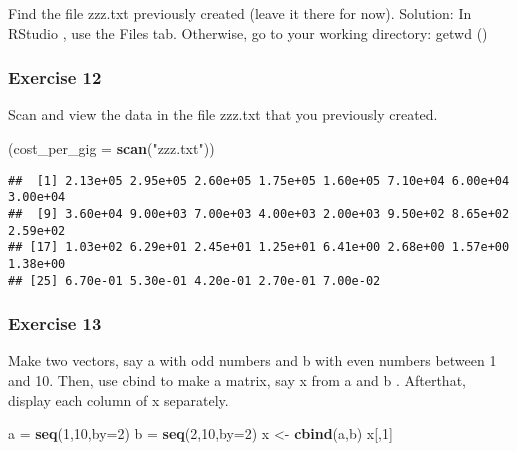 \documentclass[
]{article}
\newenvironment{Shaded}{\begin{snugshade}}{\end{snugshade}}
\newcommand{\DataTypeTok}[1]{\textcolor[rgb]{0.13,0.29,0.53}{#1}}
\newcommand{\DecValTok}[1]{\textcolor[rgb]{0.00,0.00,0.81}{#1}}
\newcommand{\KeywordTok}[1]{\textcolor[rgb]{0.13,0.29,0.53}{\textbf{#1}}}
\newcommand{\NormalTok}[1]{#1}
\newcommand{\StringTok}[1]{\textcolor[rgb]{0.31,0.60,0.02}{#1}}
\begin{document}
Find the file zzz.txt previously created (leave it there for now).
Solution: In RStudio , use the Files tab. Otherwise, go to your working
directory: getwd ()

\hypertarget{exercise-12}{%
\subsubsection{Exercise 12}\label{exercise-12}}

Scan and view the data in the file zzz.txt that you previously created.

\begin{Shaded}
\begin{Highlighting}[]
\NormalTok{(}\DataTypeTok{cost\_per\_gig =} \KeywordTok{scan}\NormalTok{(}\StringTok{"zzz.txt"}\NormalTok{))}
\end{Highlighting}
\end{Shaded}

\begin{verbatim}
##  [1] 2.13e+05 2.95e+05 2.60e+05 1.75e+05 1.60e+05 7.10e+04 6.00e+04 3.00e+04
##  [9] 3.60e+04 9.00e+03 7.00e+03 4.00e+03 2.00e+03 9.50e+02 8.65e+02 2.59e+02
## [17] 1.03e+02 6.29e+01 2.45e+01 1.25e+01 6.41e+00 2.68e+00 1.57e+00 1.38e+00
## [25] 6.70e-01 5.30e-01 4.20e-01 2.70e-01 7.00e-02
\end{verbatim}

\hypertarget{exercise-13}{%
\subsubsection{Exercise 13}\label{exercise-13}}

Make two vectors, say a with odd numbers and b with even numbers between
1 and 10. Then, use cbind to make a matrix, say x from a and b .
Afterthat, display each column of x separately.

\begin{Shaded}
\begin{Highlighting}[]
\NormalTok{a =}\StringTok{ }\KeywordTok{seq}\NormalTok{(}\DecValTok{1}\NormalTok{,}\DecValTok{10}\NormalTok{,}\DataTypeTok{by=}\DecValTok{2}\NormalTok{)}
\NormalTok{b =}\StringTok{ }\KeywordTok{seq}\NormalTok{(}\DecValTok{2}\NormalTok{,}\DecValTok{10}\NormalTok{,}\DataTypeTok{by=}\DecValTok{2}\NormalTok{)}
\NormalTok{x \textless{}{-}}\StringTok{ }\KeywordTok{cbind}\NormalTok{(a,b)}
\NormalTok{x[,}\DecValTok{1}\NormalTok{]}
\end{Highlighting}
\end{Shaded}
\end{document}
